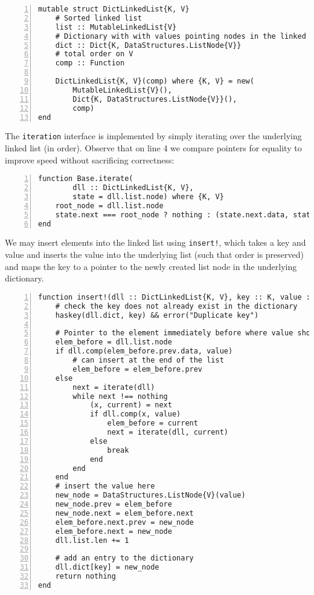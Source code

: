 \documentclass{article}
\theoremstyle{plain}
\numberwithin{theorem}{section}
\numberwithin{example}{section}
\theoremstyle{definition}
\numberwithin{definition}{section}
\begin{document}
\begin{codebox}
    \begin{Verbatim}[numbers=left,xleftmargin=5mm]
mutable struct DictLinkedList{K, V}
    # Sorted linked list
    list :: MutableLinkedList{V}
    # Dictionary with with values pointing nodes in the linked list
    dict :: Dict{K, DataStructures.ListNode{V}}
    # total order on V
    comp :: Function

    DictLinkedList{K, V}(comp) where {K, V} = new(
        MutableLinkedList{V}(),
        Dict{K, DataStructures.ListNode{V}}(),
        comp)
end
    \end{Verbatim}
\end{codebox}

The \texttt{iteration} interface is implemented by simply iterating over the
underlying linked list (in order). Observe that on line 4 we compare pointers
for equality to improve speed without sacrificing correctness:

\begin{codebox}
    \begin{Verbatim}[numbers=left,xleftmargin=5mm]
function Base.iterate(
        dll :: DictLinkedList{K, V},
        state = dll.list.node) where {K, V}
    root_node = dll.list.node
    state.next === root_node ? nothing : (state.next.data, state.next)
end
    \end{Verbatim}
\end{codebox}

We may insert elements into the linked list
using \texttt{insert!}, which takes a key and value and inserts the value into
the underlying list (such that order is preserved) and maps the key to a pointer
to the newly created list node in the underlying dictionary.

\begin{codebox}
    \begin{Verbatim}[numbers=left,xleftmargin=5mm]
function insert!(dll :: DictLinkedList{K, V}, key :: K, value :: V) where {K, V}
    # check the key does not already exist in the dictionary
    haskey(dll.dict, key) && error("Duplicate key")

    # Pointer to the element immediately before where value should be inserted
    elem_before = dll.list.node
    if dll.comp(elem_before.prev.data, value)
        # can insert at the end of the list
        elem_before = elem_before.prev
    else
        next = iterate(dll)
        while next !== nothing
            (x, current) = next
            if dll.comp(x, value)
                elem_before = current
                next = iterate(dll, current)
            else
                break
            end
        end
    end
    # insert the value here
    new_node = DataStructures.ListNode{V}(value)
    new_node.prev = elem_before
    new_node.next = elem_before.next
    elem_before.next.prev = new_node
    elem_before.next = new_node
    dll.list.len += 1

    # add an entry to the dictionary
    dll.dict[key] = new_node
    return nothing
end
    \end{Verbatim}
\end{codebox}
\end{document}
